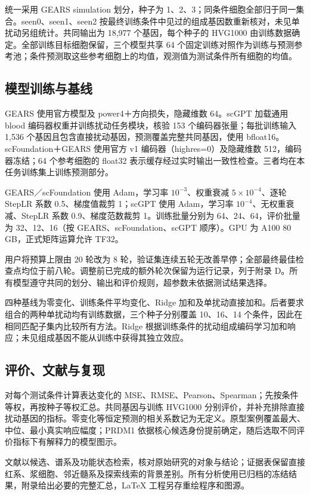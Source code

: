 \documentclass[UTF8,a4paper,11pt,fontset=fandol]{ctexart}
\begin{document}
统一采用 GEARS simulation 划分，种子为 1、2、3；同条件细胞全部归于同一集合。seen0、seen1、seen2 按最终训练条件中见过的组成基因数重新核对，未见单扰动另组统计。共同输出为 18,977 个基因，每个种子的 HVG1000 由训练数据确定。全部训练目标细胞保留，三个模型共享 64 个固定训练对照作为训练与预测参考池；条件预测取这些参考细胞上的均值，观测值为测试条件所有细胞的均值。
\subsection{模型训练与基线}
GEARS 使用官方模型及 power4＋方向损失，隐藏维数 64。scGPT 加载通用 blood 编码器权重并训练扰动任务模块，核验 153 个编码器张量；每批训练输入 1,536 个基因且包含直接扰动基因，预测覆盖完整共同基因，使用 bfloat16。scFoundation＋GEARS 使用官方 v1 编码器（highres=0）及隐藏维数 512，编码器冻结；64 个参考细胞的 float32 表示缓存经过实时输出一致性检查。三者均在本任务训练集上训练预测部分。

GEARS／scFoundation 使用 Adam，学习率 $10^{-3}$、权重衰减 $5\times10^{-4}$、逐轮 StepLR 系数 0.5、梯度值裁剪 1；scGPT 使用 Adam，学习率 $10^{-4}$、无权重衰减、StepLR 系数 0.9、梯度范数裁剪 1。训练批量分别为 64、24、64，评价批量为 32、12、16（按 GEARS、scFoundation、scGPT 顺序）。GPU 为 A100 80 GB，正式矩阵运算允许 TF32。

用户将预算上限由 20 轮改为 8 轮，验证集连续五轮无改善早停；全部最终最佳检查点均位于前八轮。调整前已完成的额外轮次保留为运行记录，列于附录 D。所有模型遵守共同的划分、输出和评价规则，超参数未依据测试结果选择。

四种基线为零变化、训练条件平均变化、Ridge 加和及单扰动直接加和。后者要求组合的两种单扰动均有训练数据，三个种子分别覆盖 10、16、14 个条件，因此在相同匹配子集内比较所有方法。Ridge 根据训练条件的扰动组成编码学习加和响应；未见组成基因不能从训练中获得其独立效应。
\subsection{评价、文献与复现}
对每个测试条件计算表达变化的 MSE、RMSE、Pearson、Spearman；先按条件等权，再按种子等权汇总。共同基因与训练 HVG1000 分别评价，并补充排除直接扰动基因的指标。零变化等恒定预测的相关系数记为无定义。原型案例覆盖最大、中位、最小真实响应幅度；PRDM1 依据核心候选身份提前确定，随后选取不同评价指标下有解释力的模型图示。

文献以候选、谱系及功能状态检索，核对原始研究的对象与结论；证据表保留直接红系、浆细胞、邻近髓系及探索线索的背景差别。所有分析使用已归档的冻结结果，附录给出必要的完整汇总，LaTeX 工程另存重绘程序和图源。
\end{document}
